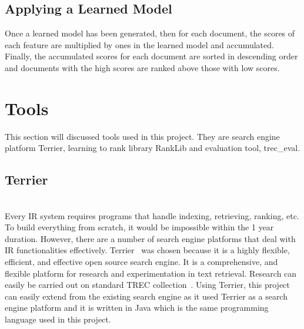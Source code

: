 \subsection{Applying a Learned Model}\label{sec:background_applyLearnedModel}
Once a learned model has been generated, then for each document, the scores of each feature are multiplied by ones in the learned model and accumulated.
Finally, the accumulated scores for each document are sorted in descending order and documents with the high scores are ranked above
those with low scores.


\section{Tools}
This section will discussed tools used in this project. They are search engine platform Terrier, learning to rank library RankLib and evaluation tool,
trec\_eval.
\subsection{Terrier}\label{section:terrier} \hspace{0pt} \\
Every IR system requires programs that handle indexing, retrieving, ranking, etc. To build everything from scratch, it would be impossible within
the 1 year duration. However, there are a number of search engine platforms that deal with IR functionalities effectively.
Terrier~\cite{terrier} was chosen because it is a highly flexible, efficient, and effective open source search engine.
It is a comprehensive, and flexible platform for research and experimentation in text retrieval. Research can easily be 
carried out on standard TREC collection~\cite{trec}. 
Using Terrier, this project can easily extend from the existing search engine as it used Terrier as a search engine platform and it is written in Java
which is the same programming language used in this project.

